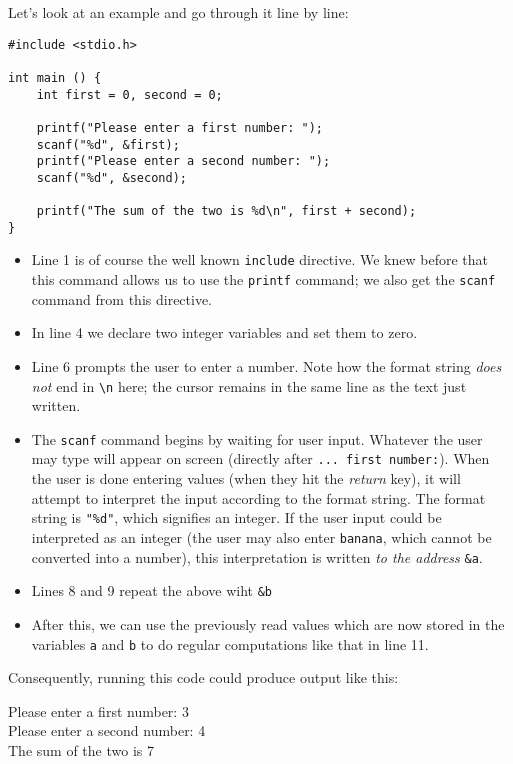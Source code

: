 Let's look at an example and go through it line by line:
\begin{codebox}[interactiveSum.c]
\begin{verbatim}
#include <stdio.h>

int main () {
    int first = 0, second = 0;
    
    printf("Please enter a first number: ");
    scanf("%d", &first);
    printf("Please enter a second number: ");
    scanf("%d", &second);
    
    printf("The sum of the two is %d\n", first + second);
}
\end{verbatim}
 \label{code:scanfSimple}
\end{codebox}
\begin{itemize}
\setlength\itemsep{0pt}
\item Line 1 is of course the well known \texttt{include} directive. We knew before that this command allows us to use the \texttt{printf} command; 
	we also get the \texttt{scanf} command from this directive.
\item In line 4 we declare two integer variables and set them to zero.
\item Line 6 prompts the user to enter a number. Note how the format string \emph{does not} end in \texttt{\textbackslash n} here; 
	the cursor remains in the same line as the text just written.
\item The \texttt{scanf} command begins by waiting for user input. Whatever the user may type will appear on screen (directly after \texttt{... first number:}).
	When the user is done entering values (\ie when they hit the \emph{return} key), it will attempt to interpret the input according to the format string.
	The format string is \texttt{"\%d"}, which signifies an integer. If the user input could be interpreted as an integer (the user may also enter \texttt{banana}, 
	which cannot be converted into a number), this interpretation is written \emph{to the address} \texttt{\&a}.
\item Lines 8 and 9 repeat the above wiht \texttt{\&b}
\item After this, we can use the previously read values which are now stored in the variables \texttt{a} and \texttt{b} to do regular computations like that in line 11.
\end{itemize}

Consequently, running this code could produce output like this:
\begin{cmdbox}
Please enter a first number: 3 \\
Please enter a second number: 4 \\
The sum of the two is 7
\end{cmdbox}


